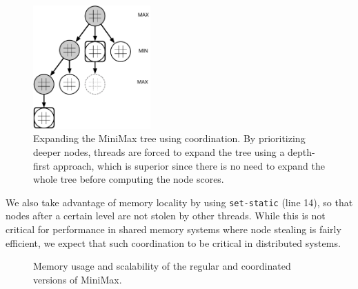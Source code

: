 \begin{figure}[h!]
   \begin{center}
      \includegraphics[width=4.5cm]{figures/minimax_tree}
   \end{center}
   \caption{Expanding the MiniMax tree using coordination. By prioritizing
      deeper nodes, threads are forced to expand the tree using a depth-first
      approach, which is superior since there is no need to expand the whole
      tree before computing the node scores.}
   \label{fig:minimax}
\end{figure}

We also take advantage of memory locality by using \texttt{set-static} (line
14), so that nodes after a certain level are not stolen by other threads. While
this is not critical for performance in shared memory systems where node
stealing is fairly efficient, we expect that such coordination to be critical in
distributed systems.

\begin{figure}[h!]
   \begin{center}
   \end{center}
   \caption{Memory usage and scalability of the regular and coordinated versions
      of MiniMax.}
   \label{results:memory_minmax}
\end{figure}

